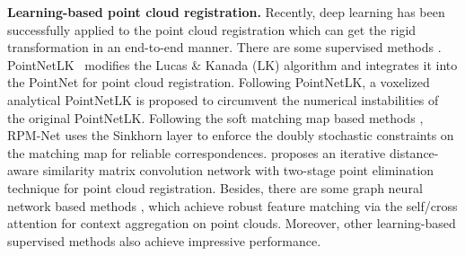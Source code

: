 \documentclass[letterpaper]{article} %
\begin{document}
	\noindent \textbf{Learning-based point cloud registration.} Recently, deep learning has been successfully applied to the point cloud registration which can get the rigid transformation in an end-to-end manner. There are some supervised methods \cite{lu2019deepvcp,yuan2020deepgmr,sarode2020masknet,huang2021predator}. PointNetLK~\cite{aoki2019pointnetlk} modifies the Lucas $\&$ Kanada (LK) algorithm and integrates it into the PointNet \cite{qi2017pointnet} for point cloud registration. Following PointNetLK, a voxelized analytical PointNetLK \cite{li2021pointnetlk} is proposed to circumvent the numerical instabilities of the original PointNetLK. %
	Following the soft matching map based methods \cite{wang2019deep,wang2019prnet}, RPM-Net \cite{yew2020rpm} uses the Sinkhorn layer to enforce the doubly stochastic constraints on the matching map for reliable correspondences. \cite{li2020iterative} proposes an iterative distance-aware similarity matrix convolution network with two-stage point elimination technique for point cloud registration. %
	Besides, there are some graph neural network based methods \cite{fischer2021stickypillars, fu2021robust}, which achieve robust feature matching via the self/cross attention for context aggregation on point clouds. %
	Moreover, other learning-based supervised methods \cite{sarode2019pcrnet,gojcic2020learning,choy2020deep,bai2021pointdsc} also achieve impressive performance.
\end{document}
